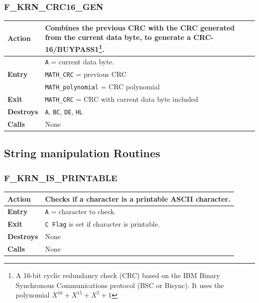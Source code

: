 \documentclass[a4paper,11pt]{article}
\begin{document}
        \subsubsection{F\_KRN\_CRC16\_GEN}
        \label{func:fkrncrc16gen}
        \begin{tabular}{l p{9cm}}
            \hline\textbf{Action}
            & Combines the previous CRC with the CRC generated from the current
            data byte, to generate a CRC-16/BUYPASS1\footnote{A 16-bit cyclic
            redundancy check (CRC) based on the IBM Binary Synchronous 
            Communications protocol (BSC or Bisync). It uses the polynomial
            $X^{16} + X^{15} +X^2 + 1$}.\\
            \hline\multirow[t]{3}{4em}{\textbf{Entry}}
            & \texttt{A} = current data byte.\\
            & \texttt{MATH\_CRC} = previous CRC\\
            & \texttt{MATH\_polynomial} = CRC polynomial\\
            \hline\textbf{Exit}
            & \texttt{MATH\_CRC} = CRC with current data byte included\\
            \hline\textbf{Destroys} & \texttt{A}, \texttt{BC}, \texttt{DE}, \texttt{HL} \\
            \hline\textbf{Calls} & None\\
            \hline
        \end{tabular}

    \subsection{String manipulation Routines}

        \subsubsection{F\_KRN\_IS\_PRINTABLE}
        \label{func:fkrnisprintable}
        \begin{tabular}{l p{9cm}}
            \hline\textbf{Action}
            & Checks if a character is a printable ASCII character.\\
            \hline\textbf{Entry} & \texttt{A} = character to check.\\
            \hline\textbf{Exit} & \texttt{C Flag} is set if character is printable.\\
            \hline\textbf{Destroys} & None\\
            \hline\textbf{Calls} & None\\
            \hline
        \end{tabular}
\end{document}
